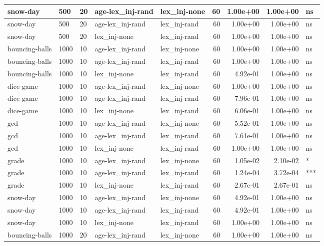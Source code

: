 \documentclass[
]{book}
\begin{document}
\begin{table}
\begin{tabular}[t]{l|l|l|l|l|r|r|r|l}
\hline
snow-day & 500 & 20 & age-lex\_inj-rand & lex\_inj-none & 60 & 1.00e+00 & 1.00e+00 & ns\\
\hline
snow-day & 500 & 20 & age-lex\_inj-rand & lex\_inj-rand & 60 & 1.00e+00 & 1.00e+00 & ns\\
\hline
snow-day & 500 & 20 & lex\_inj-none & lex\_inj-rand & 60 & 1.00e+00 & 1.00e+00 & ns\\
\hline
bouncing-balls & 1000 & 10 & age-lex\_inj-rand & lex\_inj-none & 60 & 1.00e+00 & 1.00e+00 & ns\\
\hline
bouncing-balls & 1000 & 10 & age-lex\_inj-rand & lex\_inj-rand & 60 & 1.00e+00 & 1.00e+00 & ns\\
\hline
bouncing-balls & 1000 & 10 & lex\_inj-none & lex\_inj-rand & 60 & 4.92e-01 & 1.00e+00 & ns\\
\hline
dice-game & 1000 & 10 & age-lex\_inj-rand & lex\_inj-none & 60 & 1.00e+00 & 1.00e+00 & ns\\
\hline
dice-game & 1000 & 10 & age-lex\_inj-rand & lex\_inj-rand & 60 & 7.96e-01 & 1.00e+00 & ns\\
\hline
dice-game & 1000 & 10 & lex\_inj-none & lex\_inj-rand & 60 & 6.06e-01 & 1.00e+00 & ns\\
\hline
gcd & 1000 & 10 & age-lex\_inj-rand & lex\_inj-none & 60 & 5.52e-01 & 1.00e+00 & ns\\
\hline
gcd & 1000 & 10 & age-lex\_inj-rand & lex\_inj-rand & 60 & 7.61e-01 & 1.00e+00 & ns\\
\hline
gcd & 1000 & 10 & lex\_inj-none & lex\_inj-rand & 60 & 1.00e+00 & 1.00e+00 & ns\\
\hline
grade & 1000 & 10 & age-lex\_inj-rand & lex\_inj-none & 60 & 1.05e-02 & 2.10e-02 & *\\
\hline
grade & 1000 & 10 & age-lex\_inj-rand & lex\_inj-rand & 60 & 1.24e-04 & 3.72e-04 & ***\\
\hline
grade & 1000 & 10 & lex\_inj-none & lex\_inj-rand & 60 & 2.67e-01 & 2.67e-01 & ns\\
\hline
snow-day & 1000 & 10 & age-lex\_inj-rand & lex\_inj-none & 60 & 4.92e-01 & 1.00e+00 & ns\\
\hline
snow-day & 1000 & 10 & age-lex\_inj-rand & lex\_inj-rand & 60 & 4.92e-01 & 1.00e+00 & ns\\
\hline
snow-day & 1000 & 10 & lex\_inj-none & lex\_inj-rand & 60 & 1.00e+00 & 1.00e+00 & ns\\
\hline
bouncing-balls & 1000 & 20 & age-lex\_inj-rand & lex\_inj-none & 60 & 1.00e+00 & 1.00e+00 & ns\\
\hline

\end{tabular}
\end{table}
\end{document}
